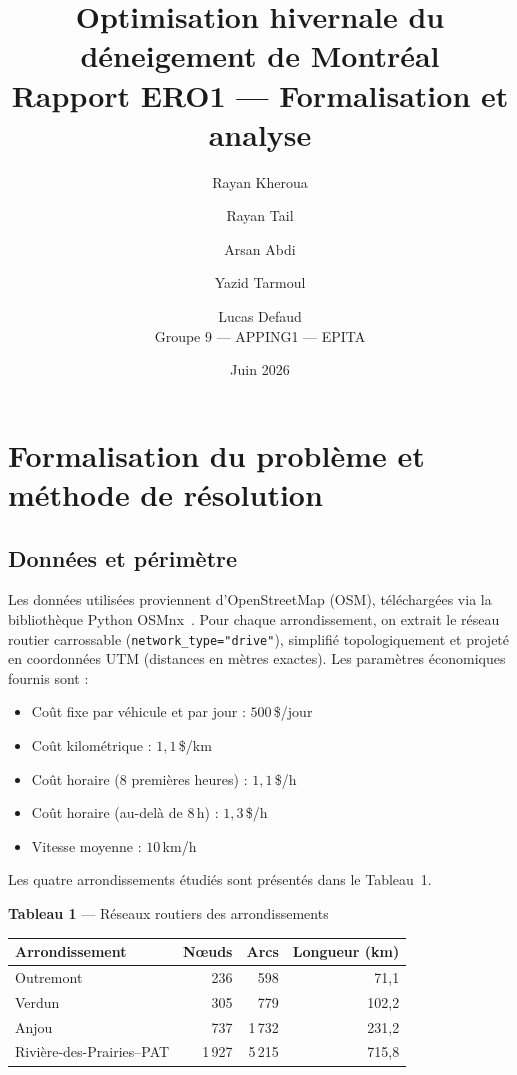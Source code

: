 \documentclass[11pt,a4paper]{article}
\title{\textbf{Optimisation hivernale du d\'eneigement de Montr\'eal}\\[0.4em]
       \large Rapport ERO1 --- Formalisation et analyse}
\author{Rayan Kheroua \and Rayan Tail \and Arsan Abdi \and Yazid Tarmoul \and Lucas Defaud\\[0.3em]
        \normalsize Groupe 9 --- APPING1 --- EPITA}
\date{Juin 2026}
\begin{document}
\maketitle
\tableofcontents
\newpage

\section{Formalisation du probl\`eme et m\'ethode de r\'esolution}

\subsection{Donn\'ees et p\'erim\`etre}

Les donn\'ees utilis\'ees proviennent d'OpenStreetMap (OSM), t\'el\'echarg\'ees
via la biblioth\`eque Python OSMnx~\cite{osmnx}. Pour chaque arrondissement,
on extrait le r\'eseau routier carrossable (\texttt{network\_type="drive"}),
simplifi\'e topologiquement et projet\'e en coordonn\'ees UTM (distances en
m\`etres exactes). Les param\`etres \'economiques fournis sont :

\begin{itemize}
  \item Co\^ut fixe par v\'ehicule et par jour : $500$\,\$/jour
  \item Co\^ut kilom\'etrique : $1{,}1$\,\$/km
  \item Co\^ut horaire (8 premi\`eres heures) : $1{,}1$\,\$/h
  \item Co\^ut horaire (au-del\`a de 8\,h) : $1{,}3$\,\$/h
  \item Vitesse moyenne : $10$\,km/h
\end{itemize}

Les quatre arrondissements \'etudi\'es sont pr\'esent\'es dans le Tableau~1.

\begin{center}
\textbf{Tableau 1} --- R\'eseaux routiers des arrondissements\\[0.5em]
\begin{tabular}{|l|r|r|r|}
\hline
\textbf{Arrondissement} & \textbf{N\oe uds} & \textbf{Arcs} & \textbf{Longueur (km)} \\
\hline
Outremont                    &    236 &     598 &    71,1 \\
Verdun                       &    305 &     779 &   102,2 \\
Anjou                        &    737 &   1\,732 &   231,2 \\
Rivi\`ere-des-Prairies--PAT  &  1\,927 &   5\,215 &   715,8 \\
\hline
\end{tabular}
\end{center}
\end{document}
